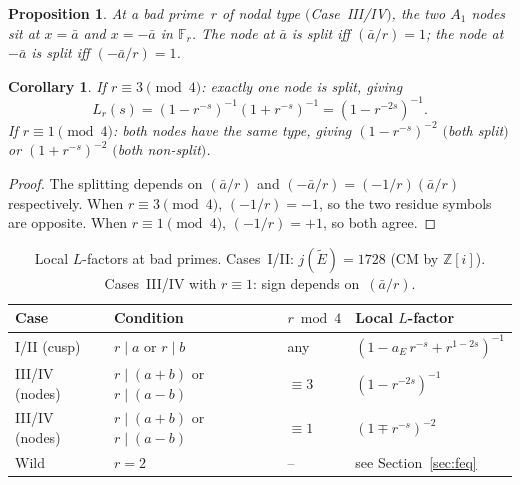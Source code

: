 \documentclass[11pt,a4paper]{article}
\newtheorem{proposition}[theorem]{Proposition}
\newtheorem{corollary}[theorem]{Corollary}
\theoremstyle{definition}
\theoremstyle{remark}
\begin{document}
\begin{proposition}\label{prop:nodesplit}
  At a bad prime~$r$ of nodal type $($Case~III/IV$)$,
  the two $A_1$ nodes sit at $x = \bar{a}$ and $x = -\bar{a}$
  in $\mathbb{F}_r$.
  The node at $\bar{a}$ is split iff $(\bar{a}/r) = 1$;
  the node at $-\bar{a}$ is split iff $(-\bar{a}/r) = 1$.
\end{proposition}

\begin{corollary}\label{cor:localfactor}
  If $r \equiv 3 \pmod{4}$: exactly one node is split, giving
  \begin{equation}\label{eq:mixed}
    L_r(s) = (1 - r^{-s})^{-1}(1 + r^{-s})^{-1}
    = (1 - r^{-2s})^{-1}.
  \end{equation}
  If $r \equiv 1 \pmod{4}$: both nodes have the same type,
  giving $(1 - r^{-s})^{-2}$ $($both split$)$ or
  $(1 + r^{-s})^{-2}$ $($both non-split$)$.
\end{corollary}

\begin{proof}
  The splitting depends on $(\bar{a}/r)$ and
  $(-\bar{a}/r) = (-1/r)(\bar{a}/r)$ respectively.
  When $r \equiv 3 \pmod{4}$, $(-1/r) = -1$, so the two residue
  symbols are opposite.
  When $r \equiv 1 \pmod{4}$, $(-1/r) = +1$, so both agree.
\end{proof}

\begin{table}[H]
\centering
\begin{tabular}{llll}
\toprule
Case & Condition & $r \bmod 4$ & Local $L$-factor \\
\midrule
I/II (cusp)
& $r \mid a$ or $r \mid b$
& any
& $(1 - a_E\, r^{-s} + r^{1-2s})^{-1}$ \\
\addlinespace
III/IV (nodes)
& $r \mid (a{+}b)$ or $r \mid (a{-}b)$
& $\equiv 3$
& $(1 - r^{-2s})^{-1}$ \\
\addlinespace
III/IV (nodes)
& $r \mid (a{+}b)$ or $r \mid (a{-}b)$
& $\equiv 1$
& $(1 \mp r^{-s})^{-2}$ \\
\addlinespace
Wild
& $r = 2$
& --
& see Section~\ref{sec:feq} \\
\bottomrule
\end{tabular}
\caption{Local $L$-factors at bad primes.
  Cases~I/II: $j(\tilde{E}) = 1728$ (CM by $\mathbb{Z}[i]$).
  Cases~III/IV with $r \equiv 1$: sign depends on~$(\bar{a}/r)$.}
\label{tab:local}
\end{table}


\end{document}
